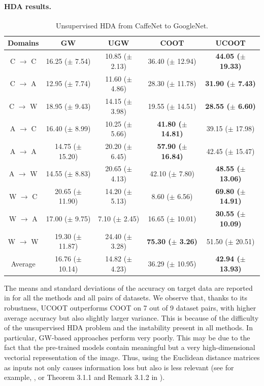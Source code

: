 \paragraph{HDA results.}
\begin{table}[t]
  \centering
  \small
		\begin{tabular}{c c c c c}
				\toprule
				Domains & GW & UGW & COOT & UCOOT \\
				\midrule

				C $\to$ C & 16.25 ($\pm$ 7.54) & 10.85 ($\pm$ 2.13) & 36.40 ($\pm$ 12.94) & \textbf{44.05 ($\pm$ 19.33)} \\
				\hline
				C $\to$ A & 12.95 ($\pm$ 7.74) & 11.60 ($\pm$ 4.86) & 28.30 ($\pm$ 11.78) & \textbf{31.90 ($\pm$ 7.43)} \\
				\hline
				C $\to$ W & 18.95 ($\pm$ 9.43) & 14.15 ($\pm$ 3.98) & 19.55 ($\pm$ 14.51) & \textbf{28.55 ($\pm$ 6.60)} \\
				\hline

				A $\to$ C & 16.40 ($\pm$ 8.99) & 10.25 ($\pm$ 5.66) & \textbf{41.80 ($\pm$ 14.81)} & 39.15 ($\pm$ 17.98) \\
				\hline
				A $\to$ A & 14.75 ($\pm$ 15.20) & 20.20 ($\pm$ 6.45) & \textbf{57.90 ($\pm$ 16.84)} & 42.45 ($\pm$ 15.47) \\
				\hline
				A $\to$ W & 14.55 ($\pm$ 8.83) & 20.65 ($\pm$ 4.13) & 42.10 ($\pm$ 7.80) & \textbf{48.55 ($\pm$ 13.06)} \\
				\hline

				W $\to$ C & 20.65 ($\pm$ 11.90) & 14.20 ($\pm$ 5.13) & 8.60 ($\pm$ 6.56) & \textbf{69.80 ($\pm$ 14.91)} \\
				\hline
				W $\to$ A & 17.00 ($\pm$ 9.75) & 7.10 ($\pm$ 2.45) & 16.65 ($\pm$ 10.01) & \textbf{30.55 ($\pm$ 10.09)} \\
				\hline
				W $\to$ W & 19.30 ($\pm$ 11.87) & 24.40 ($\pm$ 3.28) & \textbf{75.30 ($\pm$ 3.26)} & 51.50 ($\pm$ 20.51) \\
				\bottomrule
				Average & 16.76 ($\pm$ 10.14) & 14.82 ($\pm$ 4.23) & 36.29 ($\pm$ 10.95) & \textbf{42.94 ($\pm$ 13.93)} \\
				\bottomrule
			\end{tabular}
	\caption{Unsupervised HDA from CaffeNet to GoogleNet. \label{tab:hda}}
\end{table}

The means and standard deviations of the accuracy on target data are reported in 
for all the methods and all pairs of datasets. We observe that, thanks to its robustness,
UCOOT outperforms COOT on 7 out of 9 dataset pairs, with higher average accuracy
but also slightly larger variance. This is because of the difficulty of the
unsupervised HDA problem and the instability present in all methods. In particular,
GW-based approaches perform very poorly. This may be due to the fact that the
pre-trained models contain meaningful but a very high-dimensional vectorial representation
of the image. Thus, using the Euclidean distance matrices as inputs not only causes
information loss but also is less relevant (see for example, \citep{Aggarwal01},
or Theorem 3.1.1 and Remark 3.1.2 in \citep{Vershynin18}).

